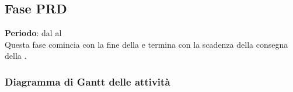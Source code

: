 \subsection{Fase PRD}
	\textbf{Periodo}: dal  al  \\Questa fase comincia con la fine della  e termina con la scadenza della consegna della .
	\subsubsection{Diagramma di Gantt delle attività}
